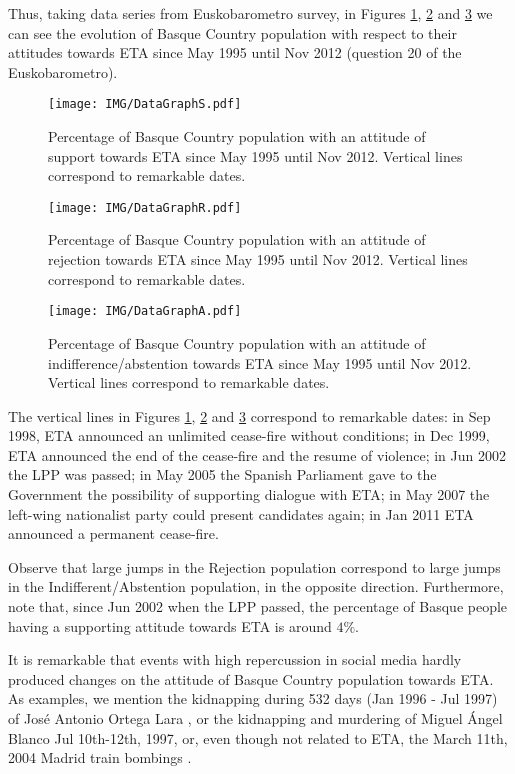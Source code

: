Thus, taking data series from Euskobarometro survey, in Figures \ref{datosS}, \ref{datosR} and \ref{datosA} we can see the evolution of Basque Country population with respect to their attitudes towards ETA since May 1995 until Nov 2012 (question 20 of the Euskobarometro).

\begin{figure}[ht]
  \centering
  \texttt{[image: IMG/DataGraphS.pdf]}
  \caption{Percentage of Basque Country population with an attitude of support towards ETA since May 1995 until Nov 2012. Vertical lines correspond to remarkable dates.}
  \label{datosS}
\end{figure} 

\begin{figure}[ht]
  \centering
  \texttt{[image: IMG/DataGraphR.pdf]}
  \caption{Percentage of Basque Country population with an attitude of rejection towards ETA since May 1995 until Nov 2012. Vertical lines correspond to remarkable dates.}
  \label{datosR}
\end{figure}

\begin{figure}[ht]
  \centering
  \texttt{[image: IMG/DataGraphA.pdf]}
  \caption{Percentage of Basque Country population with an attitude of indifference/abstention towards ETA since May 1995 until Nov 2012. Vertical lines correspond to remarkable dates.}
  \label{datosA}
\end{figure}

The vertical lines in Figures \ref{datosS}, \ref{datosR} and \ref{datosA} correspond to remarkable dates: in Sep 1998, ETA announced an unlimited cease-fire without conditions; in Dec 1999, ETA announced the end of the cease-fire and the resume of violence; in Jun 2002 the LPP was passed; in May 2005 the Spanish Parliament gave to the Government the possibility of supporting dialogue with ETA; in May 2007 the left-wing nationalist party could present candidates again; in Jan 2011 ETA announced a permanent cease-fire. 

Observe that large jumps in the Rejection population correspond to large jumps in the Indifferent/Abstention population, in the opposite direction. Furthermore, note that, since Jun 2002 when the LPP passed, the percentage of Basque people having a supporting attitude towards ETA is around $4\%$.

It is remarkable that events with high repercussion in social media hardly produced changes on the attitude of Basque Country population towards ETA. As examples, we mention the kidnapping during 532 days (Jan 1996 - Jul 1997) of Jos\'e Antonio Ortega Lara \cite{OLara1, OLara2}, or the kidnapping and murdering of Miguel \'Angel Blanco \cite{MABlanco1, MABlanco2, MABlanco3} Jul 10th-12th, 1997, or, even though not related to ETA, the March 11th, 2004 Madrid train bombings \cite{4trama, 11m}.

